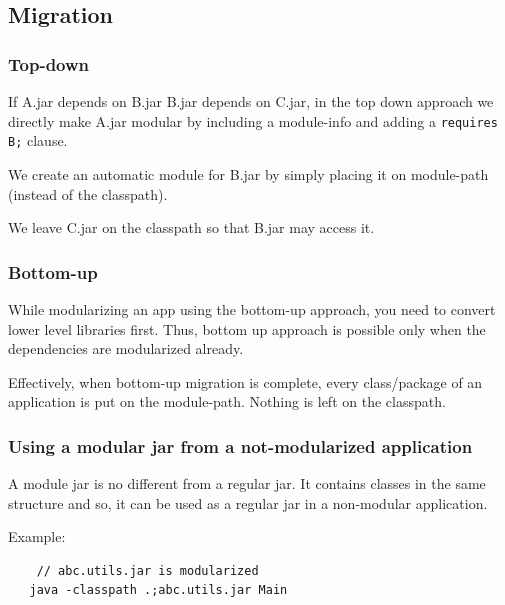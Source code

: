 \documentclass{scrartcl}
\begin{document}
\subsection{Migration}

\subsubsection{Top-down}

If A.jar depends on B.jar B.jar depends on C.jar, in the top down approach we directly make A.jar modular by including a module-info and adding a \lstinline|requires B;| clause.

We create an automatic module for B.jar by simply placing it on module-path (instead of the classpath).

We leave C.jar on the classpath so that B.jar may access it.

\subsubsection{Bottom-up}

While modularizing an app using the bottom-up approach, you need to convert lower level libraries first. Thus, bottom up approach is possible only when the dependencies are modularized already.

Effectively, when bottom-up migration is complete, every class/package of an application is put on the module-path. Nothing is left on the classpath.

\subsubsection{Using a modular jar from a not-modularized application}

A module jar is no different from a regular jar. It contains classes in the same structure and so, it can be used as a regular jar in a non-modular application.

Example:

\begin{lstlisting}
    // abc.utils.jar is modularized
   java -classpath .;abc.utils.jar Main
\end{lstlisting}
\end{document}
